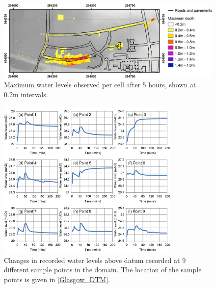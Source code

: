 \documentclass[11pt,english,a4paper]{article}
\begin{document}
\begin{figure}[tpb]
\centering
\includegraphics[width=1.0\textwidth]{Glasgow_MaxDepths.png}
\caption{Maximum water levels observed per cell after 5 hours, shown at 0.2m intervals.}
\label{Glasgow_MaxDepths}
\end{figure}
\begin{figure}[tpb]
\centering
\includegraphics[width=0.8\textwidth]{Glasgow_PointGraphs.png}
\caption{Changes in recorded water levels above datum recorded at 9 different sample points in the domain. The location of the sample points is given in \ref{Glasgow_DTM}.}
\label{Glasgow_PointGraphs}
\end{figure}
\end{document}
